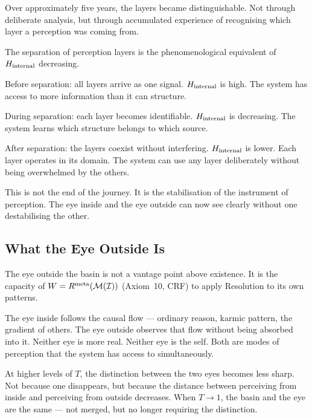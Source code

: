 \documentclass[12pt, a4paper]{article}
\begin{document}
Over approximately five years, the layers became distinguishable.
Not through deliberate analysis, but through accumulated experience of
recognising which layer a perception was coming from.

\begin{derivedbox}[title={Layer Separation as $H_{\rm internal}$ Decrease}]
The separation of perception layers is the phenomenological equivalent of
$H_{\rm internal}$ decreasing.

Before separation: all layers arrive as one signal. $H_{\rm internal}$ is high.
The system has access to more information than it can structure.

During separation: each layer becomes identifiable. $H_{\rm internal}$
is decreasing. The system learns which structure belongs to which source.

After separation: the layers coexist without interfering.
$H_{\rm internal}$ is lower. Each layer operates in its domain.
The system can use any layer deliberately without being overwhelmed
by the others.

This is not the end of the journey. It is the stabilisation of the
instrument of perception. The eye inside and the eye outside can now
see clearly without one destabilising the other.
\end{derivedbox}

\subsection{What the Eye Outside Is}

The eye outside the basin is not a vantage point above existence.
It is the capacity of $W = R^{\rm meta}(\mathcal{M}(\mathcal{I}))$ (Axiom~10, CRF)
to apply Resolution to its own patterns.

The eye inside follows the causal flow --- ordinary reason, karmic pattern,
the gradient of others. The eye outside observes that flow without
being absorbed into it. Neither eye is more real. Neither eye is the self.
Both are modes of perception that the system has access to simultaneously.

At higher levels of $T$, the distinction between the two eyes becomes
less sharp. Not because one disappears, but because the distance
between perceiving from inside and perceiving from outside decreases.
When $T \to 1$, the basin and the eye are the same --- not merged,
but no longer requiring the distinction.

\end{document}
